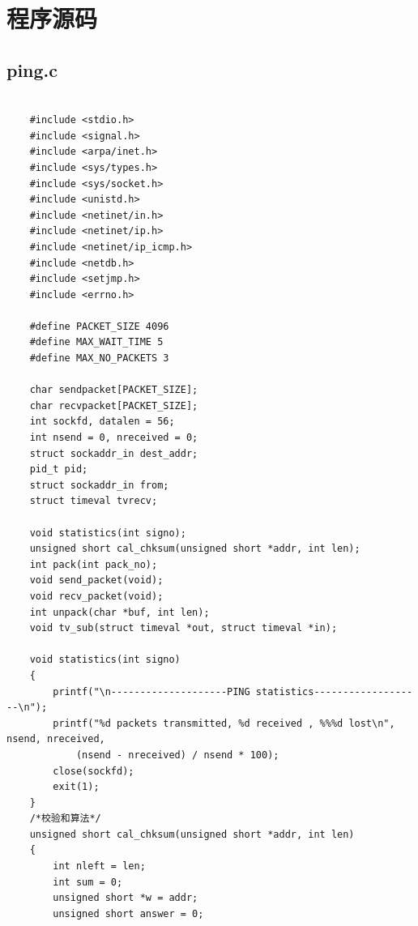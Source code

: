 \documentclass[a4paper,UTF8]{article}
\begin{document}
\section{程序源码}
\subsection{ping.c}
\begin{lstlisting}

    #include <stdio.h>
    #include <signal.h>
    #include <arpa/inet.h>
    #include <sys/types.h>
    #include <sys/socket.h>
    #include <unistd.h>
    #include <netinet/in.h>
    #include <netinet/ip.h>
    #include <netinet/ip_icmp.h>
    #include <netdb.h>
    #include <setjmp.h>
    #include <errno.h>

    #define PACKET_SIZE 4096
    #define MAX_WAIT_TIME 5
    #define MAX_NO_PACKETS 3

    char sendpacket[PACKET_SIZE];
    char recvpacket[PACKET_SIZE];
    int sockfd, datalen = 56;
    int nsend = 0, nreceived = 0;
    struct sockaddr_in dest_addr;
    pid_t pid;
    struct sockaddr_in from;
    struct timeval tvrecv;

    void statistics(int signo);
    unsigned short cal_chksum(unsigned short *addr, int len);
    int pack(int pack_no);
    void send_packet(void);
    void recv_packet(void);
    int unpack(char *buf, int len);
    void tv_sub(struct timeval *out, struct timeval *in);

    void statistics(int signo)
    {
        printf("\n--------------------PING statistics-------------------\n");
        printf("%d packets transmitted, %d received , %%%d lost\n", nsend, nreceived,
            (nsend - nreceived) / nsend * 100);
        close(sockfd);
        exit(1);
    }
    /*校验和算法*/
    unsigned short cal_chksum(unsigned short *addr, int len)
    {
        int nleft = len;
        int sum = 0;
        unsigned short *w = addr;
        unsigned short answer = 0;


\end{lstlisting}
\end{document}
